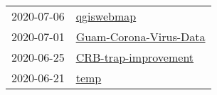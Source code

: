 \begin{longtable}{ll}
2020-07-06 &                                                     \href{https://github.com/aubreymoore/qgiswebmap}{qgiswebmap} \\
2020-07-01 &                             \href{https://github.com/aubreymoore/Guam-Corona-Virus-Data}{Guam-Corona-Virus-Data} \\
2020-06-25 &                                 \href{https://github.com/aubreymoore/CRB-trap-improvement}{CRB-trap-improvement} \\
2020-06-21 &                                                                 \href{https://github.com/aubreymoore/temp}{temp} \\
\end{longtable}
